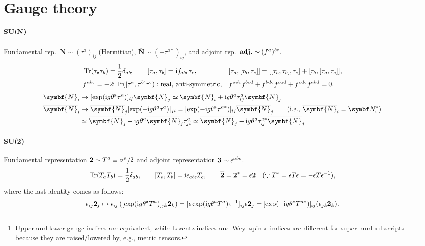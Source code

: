 \documentclass[CheatSheet]{subfiles}
\begin{document}
\summarystyle

\section{Gauge theory}
\paragraph{SU(N)}Fundamental rep.~$\symbf N\sim (\tau^{a})_{ij}$ (Hermitian), $\overline{\symbf N}\sim(-\tau^{a*})_{ij}$, and adjoint rep.~$\text{\textbf{adj.}}\sim (f^a)^{bc}$.\footnote{Upper and lower gauge indices are equivalent, while Lorentz indices and Weyl-spinor indices are different for super- and subscripts because they are raised/lowered by, e.g., metric tensors.}
\begin{align*}
 &\operatorname{\mathrm{Tr}}(\tau_a\tau_b)=\frac12\delta_{ab},\qquad
 [\tau_a,\tau_b]={\mathrm{i}} f_{abc}\tau_c,&
 &[\tau_a,[\tau_b,\tau_c]] = [[\tau_a,\tau_b],\tau_c] + [\tau_b,[\tau_a,\tau_c]],\\
 &f^{abc}=-2{\mathrm{i}}\operatorname{\mathrm{Tr}}([\tau^a,\tau^b]\tau^c): \text{real, anti-symmetric},&
 &f^{ade}f^{bcd} + f^{bde}f^{cad} + f^{cde}f^{abd} = 0.
\end{align*}
\begin{align}
 \symbf{N}_i
&\mapsto [\exp(\ii g\theta^a \tau^a)]_{ij}\symbf{N}_j
\simeq  \symbf{N}_i + \ii g\theta^a \tau^a_{ij}\symbf{N}_j\\\notag
 \overline{\symbf{N}}_i
&\mapsto
\overline{\symbf{N}}_j [\exp(-\ii g\theta^a \tau^a)]_{ji}
= [\exp(-\ii g\theta^a \tau^{a*})]_{ij} \overline{\symbf{N}}_j \qquad\text{(i.e., $\overline{\symbf{N}}_i=\symbf N_i^*$)}\\
&\simeq\overline{\symbf{N}}_j -\ii g\theta^a \overline{\symbf{N}}_j\tau^a_{ji}
\simeq \overline{\symbf{N}}_j -\ii g\theta^a \tau^{a*}_{ij} \overline{\symbf{N}}_j\end{align}

\paragraph{SU(2)} Fundamental representation $\mathbf{2}\sim T^a \equiv \sigma^a/2$ and adjoint representation $\mathbf{3}\sim \epsilon^{abc}$.
\begin{equation*}
 \operatorname{\mathrm{Tr}}(T_aT_b)=\frac12\delta_{ab},\qquad
 [T_a,T_b]={\mathrm{i}} \epsilon_{abc}T_c,\qquad
 \overline{\mathbf{2}} = \mathbf{2}^* = \epsilon\mathbf{2}\quad (\because T^*=\epsilon T \epsilon=-\epsilon T\epsilon^{-1}),
\end{equation*}
where the last identity comes as follows:
\begin{equation}
\epsilon_{ij} \mathbf{2}_j
\mapsto
\epsilon_{ij}\left(
[\exp({\mathrm{i}} g\theta^a T^a)]_{jk}\mathbf{2}_k
\right)
= [\epsilon\exp({\mathrm{i}} g\theta^a T^a)\epsilon^{-1}]_{ij}\epsilon\mathbf{2}_j
= [\exp(-{\mathrm{i}} g\theta^a T^{a*})]_{ij}(\epsilon_{jk}\mathbf{2}_k).
\end{equation}
\end{document}
